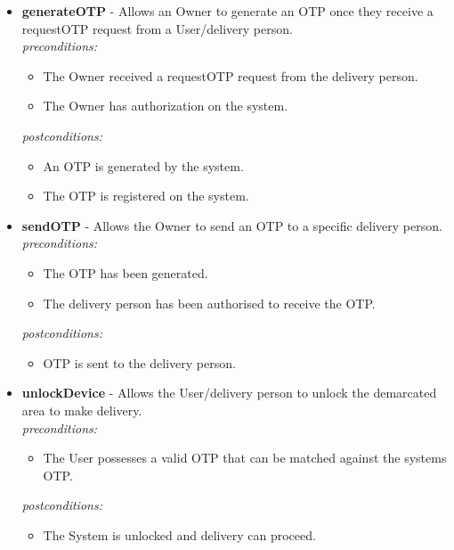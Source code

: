 \documentclass[a4paper,12pt]{article}
\begin{document}
	\begin{itemize}
		\item \textbf{generateOTP} - Allows an Owner to generate an OTP once they receive a requestOTP request from a User/delivery person.\\[0.5cm]
		\textit{preconditions:}
		\begin{itemize}
			\item The Owner received a requestOTP request from the delivery person.
			\item The Owner has authorization on the system.
		\end{itemize}
		
		\textit{postconditions:}
		\begin{itemize}
			\item An OTP is generated by the system.
			\item The OTP is registered on the system.\\[0.5cm]
		\end{itemize}
		
		\item \textbf{sendOTP} - Allows the Owner to send an OTP to a specific delivery person.\\[0.5cm]
		\textit{preconditions:}
		\begin{itemize}
			\item The OTP has been generated.
			\item The delivery person has been authorised to receive the OTP.
		\end{itemize}
		
		\textit{postconditions:}
		\begin{itemize}
			\item OTP is sent to the delivery person.\\[0.5cm]
		\end{itemize}
		
		\item \textbf{unlockDevice} - Allows the User/delivery person to unlock the demarcated area to make delivery.\\[0.5cm]
		\textit{preconditions:}
		\begin{itemize}
			\item The User possesses a valid OTP that can be matched against the systems OTP.
		\end{itemize}
		
		\textit{postconditions:}
		\begin{itemize}
			\item The System is unlocked and delivery can proceed.\\[0.5cm]
		\end{itemize}
		

\end{itemize}
\end{document}
